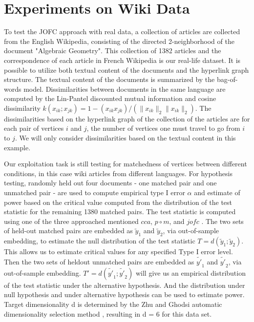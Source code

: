 \documentclass[11pt]{article} %
\begin{document}
\section{Experiments on Wiki Data}
To test the JOFC approach with real data, a collection of articles are collected from the English Wikipedia, consisting of the
 directed 2-neighborhood of the document "Algebraic Geometry". 
   This  collection of 1382 articles and the correspondence of each article in French 
Wikipedia is our real-life dataset. It is possible to utilize both textual content of the documents and the hyperlink graph structure. The textual content of the documents is summarized by the bag-of-words model. Dissimilarities between documents  in the same language are computed by the Lin-Pantel discounted mutual information \cite{LinPantel}
 and cosine dissimilarity $k(x_{ik}; x_{jk}) = 1 - (x_{ik} x_{jk})/(\|x_{ik}\|_2\|x_{ik}\|_2)$. 
 The dissimilarities based on the hyperlink graph of the collection of the articles are 
 for each pair of vertices $i$ and $j$, the number of vertices one must travel to go from $i$ to $j$.   
We will only consider dissimilarities based on the textual content in this example.
   
Our exploitation task is still testing for matchedness of vertices between different conditions, in this case wiki articles from different languages.
For hypothesis testing,   randomly held out four documents - one matched pair and one unmatched pair
 -  are used to compute empirical type I error $\alpha$ and estimate of power based on the critical value computed
  from the distribution of the test statistic for the remaining 1380 matched pairs. 
The test statistic is computed using one of the three approached mentioned  $cca$, $p\circ m$, and $jofc$ . 
The two sets of held-out matched pairs are embedded as $\tilde{y}_1$ and $\tilde{y}_2$, via out-of-sample
embedding, to estimate the null distribution of the test statistic $T = d(\tilde{y}_1; \tilde{y}_2)$. This allows
us to estimate critical values for any specified Type I error level. 
Then the two sets of heldout unmatched pairs are embedded as $\tilde{y'}_1$ and $\tilde{y'}_2$, via out-of-sample embedding. 
$T' = d(\tilde{y'}_1; \tilde{y'}_2)$ will give us an empirical distribution of the test statistic  under the alternative hypothesis. 
And the distribution under null hypothesis and under alternative hypothesis can be used to estimate power.
Target dimensionality d is determined by the Zhu and Ghodsi  automatic dimensionality selection
method \cite{ZhuGhodsi}, resulting in d = 6 for this data set.
\end{document}
